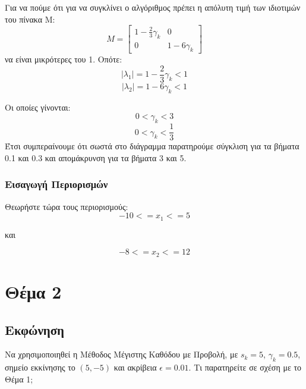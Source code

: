 \documentclass{report}
\begin{document}
Για να πούμε ότι για να συγκλίνει ο αλγόριθμος πρέπει η απόλυτη τιμή των ιδιοτιμών του πίνακα M: 
$$M = \begin{bmatrix} 1 - \frac{2}{3}\gamma_k & 0 \\ 0 & 1 - 6\gamma_k \end{bmatrix}$$
να είναι μικρότερες του 1. Οπότε:
$$|\lambda_1|= 1 - \frac{2}{3}\gamma_k < 1$$
$$|\lambda_2| = 1 - 6\gamma_k < 1$$

Οι οποίες γίνονται:
$$0 < \gamma_k < 3$$
$$0 < \gamma_k < \frac{1}{3}$$
Έτσι συμπεραίνουμε ότι σωστά στο διάγραμμα παρατηρούμε σύγκλιση για τα βήματα 0.1 και 0.3 και 
απομάκρυνση για τα βήματα 3 και 5.

\subsection{Εισαγωγή Περιορισμών}
Θεωρήστε τώρα τους περιορισμούς:
$$-10 <= x_1 <= 5$$  
\begin{center}
    και
\end{center}
$$-8 <= x_2 <= 12$$

\chapter{Θέμα 2}
\section{Εκφώνηση}
Να χρησιμοποιηθεί η Μέθοδος Μέγιστης Καθόδου με Προβολή, με $s_k = 5$, $\gamma_k = 0.5$,
σημείο εκκίνησης το $(5, -5)$ και ακρίβεια $\epsilon = 0.01$. Τι παρατηρείτε σε σχέση με το 
Θέμα 1;
\end{document}
